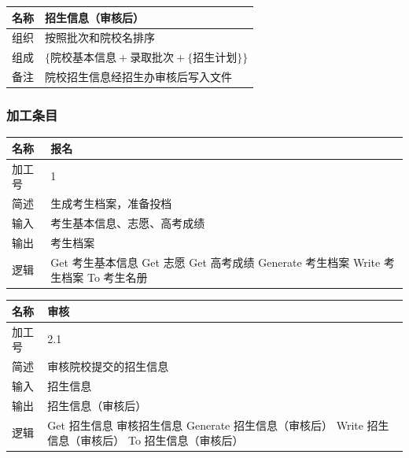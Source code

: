 \documentclass[CJK,utf8]{ctexrep}
\begin{document}
\begin{tabularx}{0.85\textwidth}{|l|X|}
	\hline
	\textbf{名称} & \textbf{招生信息（审核后）} \\
	\hline
	组织 & 按照批次和院校名排序 \\
	\hline
	组成 & $\lbrace\text{院校基本信息}+\text{录取批次}+
	\lbrace\text{招生计划}\rbrace\rbrace$ \\
	\hline
	备注 & 院校招生信息经招生办审核后写入文件 \\
	\hline
\end{tabularx}

\subsubsection*{加工条目}

\begin{tabularx}{0.85\textwidth}{|l|X|}
	\hline
	\textbf{名称} & \textbf{报名} \\
	\hline
	加工号 & 1 \\
	\hline
	简述 & 生成考生档案，准备投档 \\
	\hline
	输入 & 考生基本信息、志愿、高考成绩 \\
	\hline
	输出 & 考生档案 \\
	\hline
	\multirow{5}{*}{逻辑} & \ttfamily
		Get 考生基本信息 \newline
		Get 志愿 \newline
		Get 高考成绩 \newline
		Generate 考生档案 \newline
		Write 考生档案 To 考生名册 \\
	\hline
\end{tabularx}

\begin{tabularx}{0.85\textwidth}{|l|X|}
	\hline
	\textbf{名称} & \textbf{审核} \\
	\hline
	加工号 & 2.1 \\
	\hline
	简述 & 审核院校提交的招生信息 \\
	\hline
	输入 & 招生信息 \\
	\hline
	输出 & 招生信息（审核后） \\
	\hline
	\multirow{4}{*}{逻辑} & \ttfamily
	Get 招生信息 \newline
	审核招生信息 \newline
	Generate 招生信息（审核后） \newline
	Write 招生信息（审核后） To 招生信息（审核后） \\
	\hline
\end{tabularx}
\end{document}
